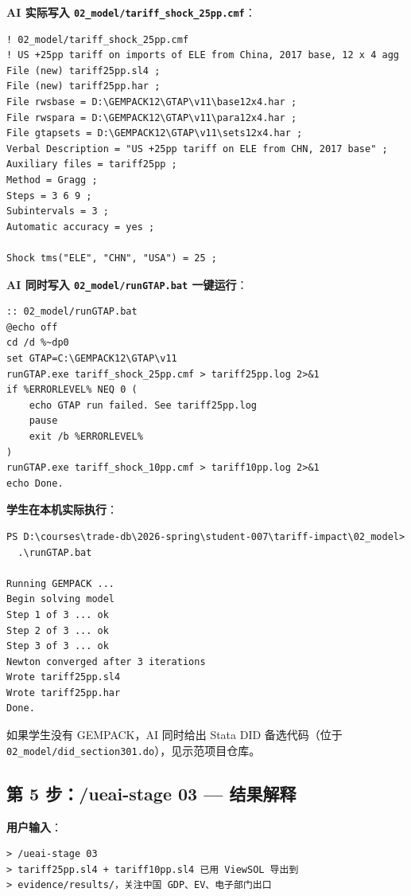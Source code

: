 \documentclass[12pt,a4paper]{article}
\begin{document}
\noindent\textbf{AI 实际写入 \texttt{02\_model/tariff\_shock\_25pp.cmf}}：
\begin{lstlisting}[style=md]
! 02_model/tariff_shock_25pp.cmf
! US +25pp tariff on imports of ELE from China, 2017 base, 12 x 4 agg
File (new) tariff25pp.sl4 ;
File (new) tariff25pp.har ;
File rwsbase = D:\GEMPACK12\GTAP\v11\base12x4.har ;
File rwspara = D:\GEMPACK12\GTAP\v11\para12x4.har ;
File gtapsets = D:\GEMPACK12\GTAP\v11\sets12x4.har ;
Verbal Description = "US +25pp tariff on ELE from CHN, 2017 base" ;
Auxiliary files = tariff25pp ;
Method = Gragg ;
Steps = 3 6 9 ;
Subintervals = 3 ;
Automatic accuracy = yes ;

Shock tms("ELE", "CHN", "USA") = 25 ;
\end{lstlisting}

\noindent\textbf{AI 同时写入 \texttt{02\_model/runGTAP.bat} 一键运行}：
\begin{lstlisting}[style=md]
:: 02_model/runGTAP.bat
@echo off
cd /d %~dp0
set GTAP=C:\GEMPACK12\GTAP\v11
runGTAP.exe tariff_shock_25pp.cmf > tariff25pp.log 2>&1
if %ERRORLEVEL% NEQ 0 (
    echo GTAP run failed. See tariff25pp.log
    pause
    exit /b %ERRORLEVEL%
)
runGTAP.exe tariff_shock_10pp.cmf > tariff10pp.log 2>&1
echo Done.
\end{lstlisting}

\noindent\textbf{学生在本机实际执行}：
\begin{lstlisting}[style=shell]
PS D:\courses\trade-db\2026-spring\student-007\tariff-impact\02_model>
  .\runGTAP.bat

Running GEMPACK ...
Begin solving model
Step 1 of 3 ... ok
Step 2 of 3 ... ok
Step 3 of 3 ... ok
Newton converged after 3 iterations
Wrote tariff25pp.sl4
Wrote tariff25pp.har
Done.
\end{lstlisting}

如果学生没有 GEMPACK，AI 同时给出 Stata DID 备选代码（位于 \texttt{02\_model/did\_section301.do}），见示范项目仓库。

\subsection{第 5 步：/ueai-stage 03 — 结果解释}

\noindent\textbf{用户输入}：
\begin{lstlisting}[style=prompt]
> /ueai-stage 03
> tariff25pp.sl4 + tariff10pp.sl4 已用 ViewSOL 导出到
> evidence/results/，关注中国 GDP、EV、电子部门出口
\end{lstlisting}
\end{document}
